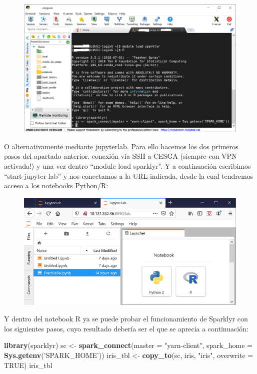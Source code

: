 \documentclass[]{book}
\newenvironment{Shaded}{\begin{snugshade}}{\end{snugshade}}
\newcommand{\KeywordTok}[1]{\textcolor[rgb]{0.13,0.29,0.53}{\textbf{#1}}}
\newcommand{\DataTypeTok}[1]{\textcolor[rgb]{0.13,0.29,0.53}{#1}}
\newcommand{\StringTok}[1]{\textcolor[rgb]{0.31,0.60,0.02}{#1}}
\newcommand{\OtherTok}[1]{\textcolor[rgb]{0.56,0.35,0.01}{#1}}
\newcommand{\NormalTok}[1]{#1}
\begin{document}
\begin{figure}
\centering
\includegraphics{images/T3-sparklyr1.png}
\caption{}
\end{figure}

O alternativamente mediante jupyterlab. Para ello hacemos los dos
primeros pasos del apartado anterior, conexión vía SSH a CESGA (siempre
con VPN activada!) y una vez dentro ``module load sparklyr''. Y a
continuación escribimos ``start-jupyter-lab'' y nos conectamos a la URL
indicada, desde la cual tendremos acceso a los notebooks Python/R:

\begin{figure}
\centering
\includegraphics{images/T3-sparklyr2.png}
\caption{}
\end{figure}

Y dentro del notebook R ya se puede probar el funcionamiento de Sparklyr
con los siguientes pasos, cuyo resultado debería ser el que se aprecia a
continuación:

\begin{Shaded}
\begin{Highlighting}[]
\KeywordTok{library}\NormalTok{(sparklyr)}
\NormalTok{sc <-}\StringTok{ }\KeywordTok{spark_connect}\NormalTok{(}\DataTypeTok{master =} \StringTok{"yarn-client"}\NormalTok{, }\DataTypeTok{spark_home =} \KeywordTok{Sys.getenv}\NormalTok{(}\StringTok{'SPARK_HOME'}\NormalTok{)) }
\NormalTok{iris_tbl <-}\StringTok{ }\KeywordTok{copy_to}\NormalTok{(sc, iris, }\StringTok{"iris"}\NormalTok{, }\DataTypeTok{overwrite =} \OtherTok{TRUE}\NormalTok{)}
\NormalTok{iris_tbl}
\end{Highlighting}
\end{Shaded}
\end{document}
